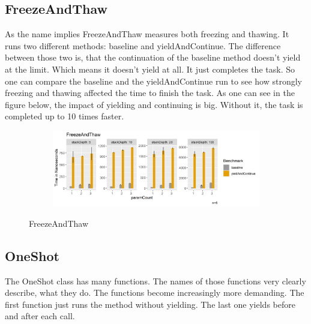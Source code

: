 \subsection{FreezeAndThaw}
As the name implies FreezeAndThaw measures both freezing and thawing. It runs two different methods: baseline and yieldAndContinue. The difference between those two is, that the continuation of the baseline method doesn't yield at the limit. Which means it doesn't yield at all. It just completes the task. So one can compare the baseline and the yieldAndContinue run to see how strongly freezing and thawing affected the time to finish the task. As one can see in the figure below, the impact of yielding and continuing is big. Without it, the task is completed up to 10 times faster.

\begin{figure}[H]
  \centering
  \begin{subfigure}[b]{1.0\textwidth}
    \includegraphics[width=1.0\linewidth]{img/jmh/FreezeAndThaw.png}
  \end{subfigure}
  \caption{FreezeAndThaw}
\end{figure}

\subsection{OneShot}
The OneShot class has many functions. The names of those functions very clearly describe, what they do. The functions become increasingly more demanding. The first function just runs the method without yielding. The last one yields before and after each call. 

